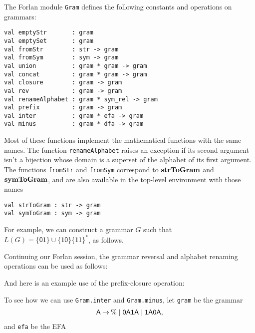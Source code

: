 The Forlan module \texttt{Gram} defines the following constants
and operations on grammars:
\begin{verbatim}
val emptyStr       : gram
val emptySet       : gram
val fromStr        : str -> gram
val fromSym        : sym -> gram
val union          : gram * gram -> gram
val concat         : gram * gram -> gram
val closure        : gram -> gram
val rev            : gram -> gram
val renameAlphabet : gram * sym_rel -> gram
val prefix         : gram -> gram
val inter          : gram * efa -> gram
val minus          : gram * dfa -> gram
\end{verbatim}
%
%
%
%
%
%
%
%
%
%
%
%
Most of these functions implement the mathematical functions with the
same names. The function \texttt{renameAlphabet} raises an exception
if its second argument isn't a bijection whose domain is a superset of
the alphabet of its first argument.  The functions \texttt{fromStr}
and \texttt{fromSym} correspond to $\mathbf{strToGram}$ and $\mathbf{symToGram}$,
and are also available in the top-level environment with those names
\begin{verbatim}
val strToGram : str -> gram
val symToGram : sym -> gram
\end{verbatim}
%
%

For example, we can construct a grammar $G$ such that
$L(G)=\mathsf{\{01\}\cup\{10\}\{11\}^*}$, as follows.

Continuing our Forlan session, the grammar reversal and alphabet
renaming operations can be used as follows:

And here is an example use of the prefix-closure operation:


To see how we can use \texttt{Gram.inter} and \texttt{Gram.minus}, let
\texttt{gram} be the grammar
\begin{gather*}
  \mathsf{A} \mathbin{\to} \% \mid \mathsf{0A1A} \mid \mathsf{1A0A} ,
\end{gather*}
and \texttt{efa} be the EFA
\begin{center}
  
\end{center}


